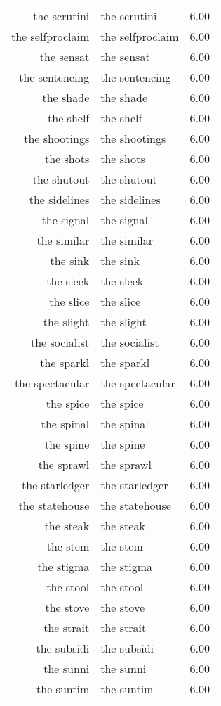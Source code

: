 \begin{table}[ht]
\begin{tabular}{rlr}
  the scrutini & the scrutini & 6.00 \\ 
  the selfproclaim & the selfproclaim & 6.00 \\ 
  the sensat & the sensat & 6.00 \\ 
  the sentencing & the sentencing & 6.00 \\ 
  the shade & the shade & 6.00 \\ 
  the shelf & the shelf & 6.00 \\ 
  the shootings & the shootings & 6.00 \\ 
  the shots & the shots & 6.00 \\ 
  the shutout & the shutout & 6.00 \\ 
  the sidelines & the sidelines & 6.00 \\ 
  the signal & the signal & 6.00 \\ 
  the similar & the similar & 6.00 \\ 
  the sink & the sink & 6.00 \\ 
  the sleek & the sleek & 6.00 \\ 
  the slice & the slice & 6.00 \\ 
  the slight & the slight & 6.00 \\ 
  the socialist & the socialist & 6.00 \\ 
  the sparkl & the sparkl & 6.00 \\ 
  the spectacular & the spectacular & 6.00 \\ 
  the spice & the spice & 6.00 \\ 
  the spinal & the spinal & 6.00 \\ 
  the spine & the spine & 6.00 \\ 
  the sprawl & the sprawl & 6.00 \\ 
  the starledger & the starledger & 6.00 \\ 
  the statehouse & the statehouse & 6.00 \\ 
  the steak & the steak & 6.00 \\ 
  the stem & the stem & 6.00 \\ 
  the stigma & the stigma & 6.00 \\ 
  the stool & the stool & 6.00 \\ 
  the stove & the stove & 6.00 \\ 
  the strait & the strait & 6.00 \\ 
  the subsidi & the subsidi & 6.00 \\ 
  the sunni & the sunni & 6.00 \\ 
  the suntim & the suntim & 6.00 \\ 

\end{tabular}
\end{table}
